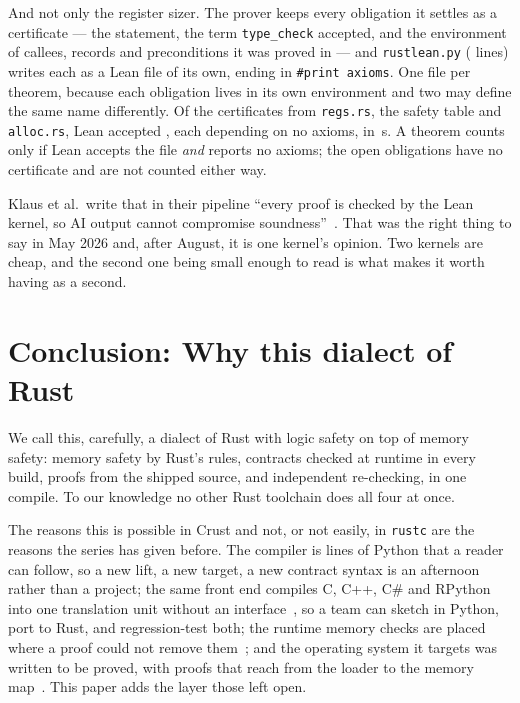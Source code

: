 \documentclass[11pt]{article}
\begin{document}
And not only the register sizer.  The prover keeps every obligation it
settles as a certificate --- the statement, the term \texttt{type\_check}
accepted, and the environment of callees, records and preconditions it was
proved in --- and \texttt{rustlean.py} (\rustleanLines{} lines) writes each
as a Lean file of its own, ending in \texttt{\#print axioms}.  One file per
theorem, because each obligation lives in its own environment and two may
define the same name differently.  Of the \rustCertificates{} certificates
from \texttt{regs.rs}, the safety table and \texttt{alloc.rs}, Lean accepted
\rustLeanAgreed{}, each depending on no axioms, in \rustLeanSeconds{}\,s.  A
theorem counts only if Lean accepts the file \emph{and} reports no axioms;
the open obligations have no certificate and are not counted either way.

Klaus et al.\ write that in their pipeline ``every proof is checked by the
Lean kernel, so AI output cannot compromise soundness''~\cite{klaus2026}.
That was the right thing to say in May 2026 and, after August, it is one
kernel's opinion.  Two kernels are cheap, and the second one being small
enough to read is what makes it worth having as a second.

\section{Conclusion: Why this dialect of Rust}

We call this, carefully, a dialect of Rust with logic safety on top of
memory safety: memory safety by Rust's rules, contracts checked at runtime
in every build, proofs from the shipped source, and independent re-checking,
in one compile.  To our knowledge no other Rust toolchain does all four at
once.

The reasons this is possible in Crust and not, or not easily, in
\texttt{rustc} are the reasons the series has given before.  The compiler
is \crustLines{} lines of Python that a reader can follow, so a new lift, a
new target, a new contract syntax is an afternoon rather than a project;
the same front end compiles C, C++, C\# and RPython into one translation
unit without an interface~\cite{hartshorn2026interop}, so a team can
sketch in Python, port to Rust, and regression-test both; the runtime
memory checks are placed where a proof could not remove
them~\cite{hartshorn2026memsafe}; and the operating system it targets was
written to be proved, with proofs that reach from the loader to the memory
map~\cite{hartshorn2026leanos}.  This paper adds the layer those left open.
\end{document}
